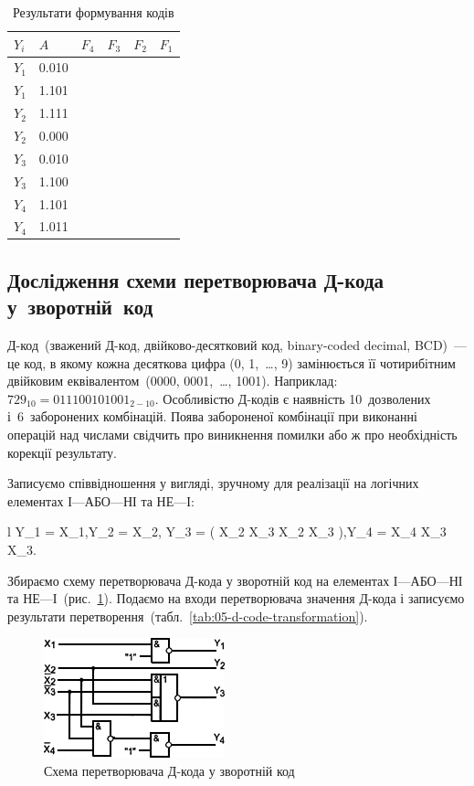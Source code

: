 \documentclass[a4paper,oneside,DIV=12,12pt,headings=normal]{scrartcl}
\newcommand{\allcaps}[1]{{\addfontfeatures{LetterSpace = 3}#1}}
\begin{document}
			\begin{table}[!htbp]
				\centering
				\begin{tabular}{ll*{4}{r}}
					\toprule
						$Y_i$ & $A$   & $F_4$ & $F_3$ & $F_2$ & $F_1$ \\
					\midrule
						$Y_1$ & 0.010 &       &       &       & \\
						$Y_1$ & 1.101 &       &       &       & \\
						$Y_2$ & 1.111 &       &       &       & \\
						$Y_2$ & 0.000 &       &       &       & \\
						$Y_3$ & 0.010 &       &       &       & \\
						$Y_3$ & 1.100 &       &       &       & \\
						$Y_4$ & 1.101 &       &       &       & \\
						$Y_4$ & 1.011 &       &       &       & \\
					\bottomrule
				\end{tabular}
				\caption{Результати формування кодів}
				\label{tab:04-transformation}
			\end{table}

		\subsection{Дослідження схеми перетворювача Д-кода у~зворотній~код}
			Д-код~(зважений Д-код, двійково-десятковий код, binary-coded decimal, \allcaps{BCD})~— це код, в якому кожна десяткова цифра (0, 1,~…, 9) замінюється її чотирибітним двійковим еквівалентом~(0000, 0001,~…, 1001). Наприклад: $729_{10} = 0111 0010 1001_{2-10}$. Особливістю Д-кодів є наявність 10~дозволених і~6~заборонених комбінацій. Поява забороненої комбінації при виконанні операцій над числами свідчить про виникнення помилки або ж про необхідність корекції результату.

			Записуємо співвідношення у вигляді, зручному для реалізації на логічних елементах І—АБО—НІ та НЕ—І:
			\begin{IEEEeqnarray*}{l}
				Y_1 = \neg X_1,\quad  Y_2 = X_2,\quad
				Y_3 = \neg \left( \neg X_2 \land \neg X_3 \lor X_2 \land X_3 \right),\quad Y_4 = \neg X_4 \land \neg X_3 \land \neg X_3.
			\end{IEEEeqnarray*}

			Збираємо схему перетворювача Д-кода у зворотній код на елементах І—АБО—НІ та НЕ—І~(рис.~\ref{fig:05-d-code}). Подаємо на входи перетворювача значення Д-кода і записуємо результати перетворення~(табл.~\ref{tab:05-d-code-transformation}).
			\begin{figure}[!htbp]
				\centering
				\includegraphics[width = 0.33\linewidth]{./assets/05.png}
				\caption{Схема перетворювача Д-кода у зворотній код}
				\label{fig:05-d-code}
			\end{figure}
\end{document}
